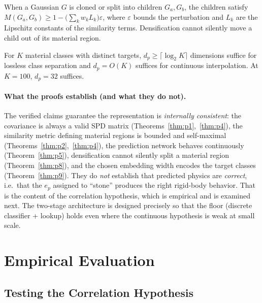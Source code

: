 \documentclass[twoside,11pt]{article}
\begin{document}
\begin{theorem}
\label{thm:p8}
When a Gaussian $G$ is cloned or split into children $G_a, G_b$, the children satisfy $M(G_a, G_b) \ge 1 - \big(\sum_k w_k L_k\big)\varepsilon$, where $\varepsilon$ bounds the perturbation and $L_k$ are the Lipschitz constants of the similarity terms. Densification cannot silently move a child out of its material region.
\end{theorem}

\begin{theorem}
\label{thm:p9}
For $K$ material classes with distinct targets, $d_p \ge \lceil \log_2 K \rceil$ dimensions suffice for lossless class separation and $d_p = O(K)$ suffices for continuous interpolation. At $K = 100$, $d_p = 32$ suffices.
\end{theorem}

\paragraph{What the proofs establish (and what they do not).}
The verified claims guarantee the representation is \emph{internally consistent}: the covariance is always a valid SPD matrix (Theorems~\ref{thm:p1},~\ref{thm:p4}), the similarity metric defining material regions is bounded and self-maximal (Theorems~\ref{thm:p2},~\ref{thm:p4}), the prediction network behaves continuously (Theorem~\ref{thm:p5}), densification cannot silently split a material region (Theorem~\ref{thm:p8}), and the chosen embedding width encodes the target classes (Theorem~\ref{thm:p9}). They do \emph{not} establish that predicted physics are \emph{correct}, i.e.\ that the $e_p$ assigned to ``stone'' produces the right rigid-body behavior. That is the content of the correlation hypothesis, which is empirical and is examined next. The two-stage architecture is designed precisely so that the floor (discrete classifier + lookup) holds even where the continuous hypothesis is weak at small scale.

\section{Empirical Evaluation}
\label{sec:empirical}

\subsection{Testing the Correlation Hypothesis}
\end{document}
